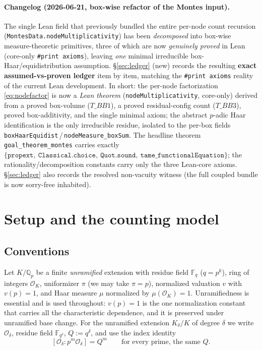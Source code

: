 \documentclass[11pt]{article}
\theoremstyle{definition}
\theoremstyle{remark}
\newcommand{\OK}{\mathcal{O}_K}
\newcommand{\Odelta}{\mathcal{O}_\delta}
\newcommand{\Fq}{\mathbb{F}_q}
\newcommand{\Qp}{\mathbb{Q}_p}
\newcommand{\vp}{v}
\begin{document}
\paragraph{Changelog (2026-06-21, box-wise refactor of the Montes input).}
The single Lean field that previously bundled the entire per-node count recursion
(\texttt{MontesData.nodeMultiplicativity}) has been \emph{decomposed} into box-wise
measure-theoretic primitives, three of which are now \emph{genuinely proved} in Lean
(core-only \texttt{\#print axioms}), leaving \emph{one} minimal irreducible
box-Haar/equidistribution assumption. \S\ref{sec:ledger} (new) records the resulting
\textbf{exact assumed-vs-proven ledger} item by item, matching the
\texttt{\#print axioms} reality of the current Lean development. In short: the
per-node factorization \eqref{eq:nodefactor} is now a \emph{Lean theorem}
(\texttt{nodeMultiplicativity}, core-only) derived from a proved box-volume
($T\_BB1$), a proved residual-config count ($T\_BB3$), proved box-additivity, and the
single minimal axiom; the abstract $p$-adic Haar identification is the only
irreducible residue, isolated to the per-box fields
\texttt{boxHaarEquidist}\,/\,\texttt{nodeMeasure\_boxSum}. The headline theorem
\texttt{goal\_theorem\_montes} carries exactly
$\{\texttt{propext},\ \texttt{Classical.choice},\ \texttt{Quot.sound},\
\texttt{tame\_functionalEquation}\}$; the rationality/decomposition constants carry
only the three Lean-core axioms. \S\ref{sec:ledger} also records the resolved
non-vacuity witness (the full coupled bundle is now sorry-free inhabited).

\tableofcontents

\section{Setup and the counting model}\label{sec:counting}

\subsection{Conventions}

Let $K/\Qp$ be a finite \emph{unramified} extension with residue field $\Fq$
($q=p^k$), ring of integers $\OK$, uniformizer $\pi$ (we may take $\pi=p$),
normalized valuation $\vp$ with $\vp(p)=1$, and Haar measure $\mu$ normalized by
$\mu(\OK)=1$. Unramifiedness is essential and is used throughout: $\vp(p)=1$ is
the one normalization constant that carries all the characteristic dependence, and
it is preserved under unramified base change. For the unramified extension
$K_\delta/K$ of degree $\delta$ we write $\Odelta$, residue field $\mathbb F_{q^\delta}$,
$Q:=q^\delta$, and use the index identity
\begin{equation}\label{eq:index}
  [\Odelta : p^m\Odelta] = Q^m \qquad\text{for every prime, the same $Q$.}
\end{equation}
\end{document}
